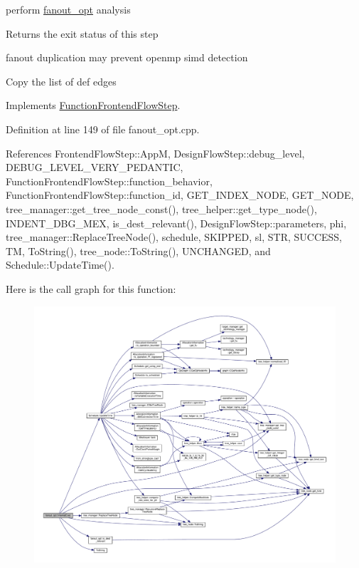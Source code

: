 perform \hyperlink{classfanout__opt}{fanout\+\_\+opt} analysis 

\begin{DoxyReturn}{Returns}
the exit status of this step 
\end{DoxyReturn}
fanout duplication may prevent openmp simd detection

Copy the list of def edges 

Implements \hyperlink{classFunctionFrontendFlowStep_a00612f7fb9eabbbc8ee7e39d34e5ac68}{Function\+Frontend\+Flow\+Step}.



Definition at line 149 of file fanout\+\_\+opt.\+cpp.



References Frontend\+Flow\+Step\+::\+AppM, Design\+Flow\+Step\+::debug\+\_\+level, D\+E\+B\+U\+G\+\_\+\+L\+E\+V\+E\+L\+\_\+\+V\+E\+R\+Y\+\_\+\+P\+E\+D\+A\+N\+T\+IC, Function\+Frontend\+Flow\+Step\+::function\+\_\+behavior, Function\+Frontend\+Flow\+Step\+::function\+\_\+id, G\+E\+T\+\_\+\+I\+N\+D\+E\+X\+\_\+\+N\+O\+DE, G\+E\+T\+\_\+\+N\+O\+DE, tree\+\_\+manager\+::get\+\_\+tree\+\_\+node\+\_\+const(), tree\+\_\+helper\+::get\+\_\+type\+\_\+node(), I\+N\+D\+E\+N\+T\+\_\+\+D\+B\+G\+\_\+\+M\+EX, is\+\_\+dest\+\_\+relevant(), Design\+Flow\+Step\+::parameters, phi, tree\+\_\+manager\+::\+Replace\+Tree\+Node(), schedule, S\+K\+I\+P\+P\+ED, sl, S\+TR, S\+U\+C\+C\+E\+SS, TM, To\+String(), tree\+\_\+node\+::\+To\+String(), U\+N\+C\+H\+A\+N\+G\+ED, and Schedule\+::\+Update\+Time().

Here is the call graph for this function\+:
\nopagebreak
\begin{figure}[H]
\begin{center}
\leavevmode
\includegraphics[width=350pt]{dc/df3/classfanout__opt_aca7aa64720a8242be9722e2216f57344_cgraph}
\end{center}
\end{figure}
\mbox{\label{classfanout__opt_a37b7c68c5c7bd86b3e27508da2544643}} 
